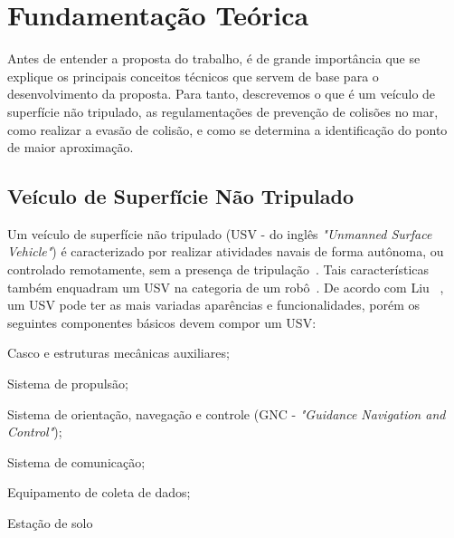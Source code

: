 


\chapter{Fundamentação Teórica}\label{chap2:fund_teo}
    Antes de entender a proposta do trabalho, é de grande importância que se explique os principais conceitos técnicos que servem de base para o desenvolvimento da proposta. Para tanto, descrevemos o que é um veículo de superfície não tripulado, as regulamentações de prevenção de colisões no mar, como realizar a evasão de colisão, e como se determina a identificação do ponto de maior aproximação.
    \section{Veículo de Superfície Não Tripulado}\label{subchap2:USV}
        Um veículo de superfície não tripulado (USV - do inglês \textit{"Unmanned Surface Vehicle"}) é caracterizado por realizar atividades navais de forma autônoma, ou controlado remotamente, sem a presença de tripulação~\cite{LIU201671}. Tais características também enquadram um USV na categoria de um robô~\cite{JURAK2020}.
        De acordo com Liu \etal~\cite{LIU201671}, um USV pode ter as mais variadas aparências e funcionalidades, porém os seguintes componentes básicos devem compor um USV: 
        \begin{enumerate*}[label=\alph*)]
            \item Casco e estruturas mecânicas auxiliares;
            \item Sistema de propulsão;
            \item Sistema de orientação, navegação e controle (GNC - \textit{"Guidance Navigation and Control"});
            \item Sistema de comunicação;
            \item Equipamento de coleta de dados;
            \item Estação de solo
        \end{enumerate*}
        
